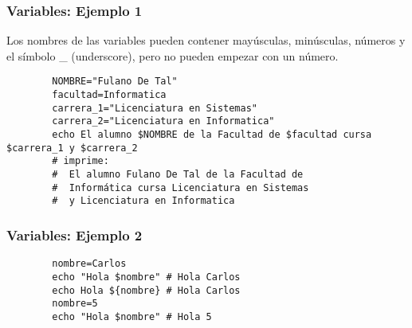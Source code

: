\begin{frame}[fragile]
	\frametitle{Variables: Ejemplo 1}
Los nombres de las variables pueden contener mayúsculas, minúsculas, números y el símbolo \_ (underscore)‏, pero no pueden empezar con un número.
	\begin{lstlisting}
		NOMBRE="Fulano De Tal"
		facultad=Informatica
		carrera_1="Licenciatura en Sistemas"
		carrera_2="Licenciatura en Informatica"
		echo El alumno $NOMBRE de la Facultad de $facultad cursa $carrera_1 y $carrera_2
		# imprime:
		#  El alumno Fulano De Tal de la Facultad de 
		#  Informática cursa Licenciatura en Sistemas
		#  y Licenciatura en Informatica
	\end{lstlisting}
\end{frame}
\begin{frame}[fragile]
	\frametitle{Variables: Ejemplo 2}
	\begin{lstlisting}
		nombre=Carlos
		echo "Hola $nombre" # Hola Carlos
		echo Hola ${nombre} # Hola Carlos
		nombre=5
		echo "Hola $nombre" # Hola 5
	\end{lstlisting}%
\end{frame}

